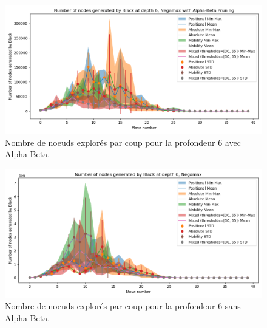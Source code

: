 \begin{figure}[H]
    \centering
    \includegraphics[width=1\textwidth]{ressources/Number of nodes generated by Black_depth_6_Negamax with Alpha-Beta Pruning.png}
    \caption{Nombre de noeuds explorés par coup pour la profondeur 6 avec Alpha-Beta.}
    \label{fig:node_explored_alpha_beta_6}
\end{figure}

\begin{figure}[H]
    \centering
    \includegraphics[width=1\textwidth]{ressources/Number of nodes generated by Black_depth_6_Negamax.png}
    \caption{Nombre de noeuds explorés par coup pour la profondeur 6 sans Alpha-Beta.}
    \label{fig:node_explored_negamax_6}
\end{figure}

